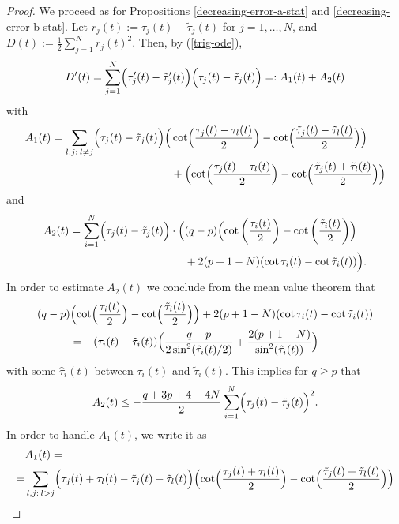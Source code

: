 \documentclass[10pt,a4paper]{amsart}
\begin{document}
 \begin{proof} We proceed as for  Propositions \ref{decreasing-error-a-stat} and \ref{decreasing-error-b-stat}.
   Let $r_j(t):=\tau_j(t)-\tilde \tau_j(t)$ for $j=1,\ldots,N$, and $D(t):=\frac{1}{2}\sum_{j=1}^N r_j(t)^2$.
   Then,  by (\ref{trig-ode}),
\begin{equation}
  D^\prime(t) = 
  \sum_{j=1}^N\Bigl( \tau_j^\prime(t)- \tilde \tau_j^\prime(t)\Bigr)\Bigl( \tau_j(t)- \tilde \tau_j(t)\Bigr)
=:  A_1(t)+A_2(t) \end{equation}
with
\begin{align}
A_1(t)= \sum_{l,j: \> l\ne j}\Bigl( \tau_j(t)- \tilde \tau_j(t)\Bigr)\Bigl(&\cot\Bigl(\frac{\tau_j(t)-\tau_l(t)}{2}\Bigr)-
\cot\Bigl(\frac{\tilde \tau_j(t)-\tilde \tau_l(t)}{2}\Bigr)\Bigr)\notag\\
&+\Bigl(\cot\Bigl(\frac{\tau_j(t)+\tau_l(t)}{2}\Bigr)-
\cot\Bigl(\frac{\tilde \tau_j(t)+\tilde \tau_l(t)}{2}\Bigr)\Bigr)\notag
\end{align}
and
\begin{align}
  A_2(t)=\sum_{i=1}^N \Bigl( \tau_j(t)- \tilde \tau_j(t)\Bigr)
  \cdot\Bigl( &(q-p)\Bigl(\cot\left(\frac{\tau_i(t)}{2}\right)-\cot\left(\frac{\tilde\tau_i(t)}{2}\right)\Bigr)\notag\\
&+2(p+1-N)(\cot\tau_i(t) -\cot\tilde\tau_i(t))\Bigr).
\notag
\end{align}
In order to estimate  $A_2(t)$ we conclude from the mean value theorem that
\begin{align}\label{sine-estimate}
(q-p)&\Bigl(\cot\Bigl(\frac{\tau_i(t)}{2}\Bigr)-\cot\Bigl(\frac{\tilde\tau_i(t)}{2}\Bigr)\Bigr)
+2(p+1-N)(\cot\tau_i(t) -\cot\tilde\tau_i(t))\notag\\
&= -(\tau_i(t)-\tilde\tau_i(t))\Bigl(\frac{q-p}{2\sin^2 (\hat\tau_i(t)/2)} + \frac{2(p+1-N)}{\sin^2 (\hat\tau_i(t))}\Bigr)
\end{align}
with some $\hat\tau_i(t)$ between $\tau_i(t)$ and  $\tilde\tau_i(t)$. This implies for $q\ge p$ that
\begin{equation}\label{est-jacobi-a2}  A_2(t)\le -\frac{q+3p+4-4N}{2}\sum_{i=1}^N \Bigl( \tau_j(t)- \tilde \tau_j(t)\Bigr)^2.
\end{equation}
In order to handle  $A_1(t)$, we write it as
\begin{align}
 & A_1(t)= \notag\\ =& 
  \sum_{l,j: \> l> j}\Bigl( \tau_j(t)+ \tau_l(t) -\tilde \tau_j(t)-\tilde \tau_l(t)\Bigr)
 \Bigl(\cot\Bigl(\frac{\tau_j(t)+\tau_l(t)}{2}\Bigr)-
\cot\Bigl(\frac{\tilde \tau_j(t)+\tilde \tau_l(t)}{2}\Bigr)\Bigr)\notag\\

\end{align}
\end{proof}
\end{document}
